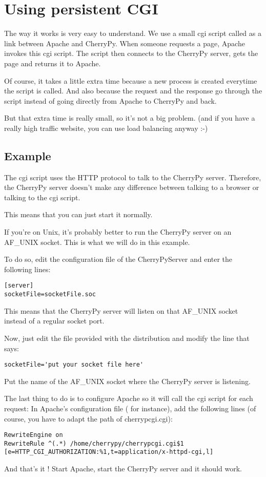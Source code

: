 \documentclass{manual}
\begin{document}
\section{Using persistent CGI}

The way it works is very easy to understand. We use a small cgi script called 
as a link between Apache and CherryPy. When someone requests a page, Apache invokes this cgi script.
The script then connects to the CherryPy server, gets the page and returns it to Apache.

Of course, it takes a little extra time because a new process is created everytime the script is
called. And also because the request and the response go through the script instead of going directly
from Apache to CherryPy and back.

But that extra time is really small, so it's not a big problem. (and if you have a really high traffic
website, you can use load balancing anyway :-)

\subsection{Example}
The cgi script uses the HTTP protocol to talk to the CherryPy server. Therefore, the CherryPy server
doesn't make any difference between talking to a browser or talking to the cgi script.

This means that you can just start it normally.

If you're on Unix, it's probably better to run the CherryPy server on an AF_UNIX socket. This is what we will
do in this example.

To do so, edit the configuration file of the CherryPyServer and enter the following lines:
\begin{verbatim}
[server]
socketFile=socketFile.soc
\end{verbatim}
This means that the CherryPy server will listen on that AF_UNIX socket instead of a regular socket port.

Now, just edit the  file provided with the distribution and modify the line that says:
\begin{verbatim}
socketFile='put your socket file here'
\end{verbatim}
Put the name of the AF_UNIX socket where the CherryPy server is listening.

The last thing to do is to configure Apache so it will call the cgi script for each request:
In Apache's configuration file ( for instance), add the following lines (of course, you have
to adapt the path of cherrypcgi.cgi):
\begin{verbatim}
RewriteEngine on
RewriteRule ^(.*) /home/cherrypy/cherrypcgi.cgi$1 [e=HTTP_CGI_AUTHORIZATION:%1,t=application/x-httpd-cgi,l]
\end{verbatim}
And that's it ! Start Apache, start the CherryPy server and it should work.
\end{document}
